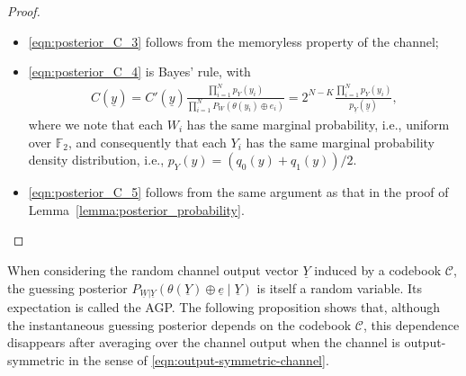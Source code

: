 \documentclass[letterpaper,draftclsnofoot,onecolumn]{IEEEtran}
\begin{document}
\begin{proof}
\begin{itemize}
    \begin{eqnarray}
        C'(\underline{y}) = \frac{P_{\underline{W}}(\theta(\underline{y})\oplus \underline{e})}{p_{\underline{Y}}(\underline{y})} = \frac{1}{2^K p_{\underline{Y}}(\underline{y})};
    \end{eqnarray}
    \item \eqref{eqn:posterior_C_3} follows from the memoryless property of the channel;
    \item \eqref{eqn:posterior_C_4} is Bayes' rule, with
    \begin{eqnarray}\label{eqn:C-y}
        C(\underline{y}) = C'(\underline{y}) \frac{\prod_{i = 1}^N p_Y(y_i)}{\prod_{i = 1}^N P_W(\theta(y_i) \oplus e_i)} = 2^{N - K} \frac{\prod_{i = 1}^N p_Y(y_i)}{p_{\underline{Y}}(\underline{y})},
    \end{eqnarray}
    where we note that each $W_i$ has the same marginal probability, i.e., uniform over $\mathbb{F}_2$, and consequently that each $Y_i$   
    has the same marginal probability density distribution, i.e., $p_Y(y) = (q_0(y) + q_1(y))/2$.
    \item \eqref{eqn:posterior_C_5} follows from the same argument as that in the proof of Lemma~\ref{lemma:posterior_probability}.
\end{itemize}
\end{proof}


When considering the random channel output vector $\underline{Y}$ induced by a codebook $\mathcal{C}$, the guessing posterior $P_{\underline{W}|\underline{Y}}\left(\theta(\underline{Y}) \oplus \underline{e} \mid \underline{Y}\right)$ is itself a random variable. Its expectation is called the AGP. The following proposition shows that, although the instantaneous guessing posterior depends on the codebook $\mathcal{C}$, this dependence disappears after averaging over the channel output when the channel is output-symmetric in the sense of \eqref{eqn:output-symmetric-channel}.
\end{document}
